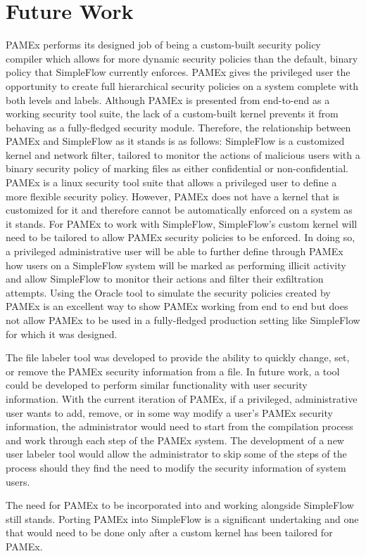 \section{Future Work}
\label{sec:FutureWork}
\par 
\vspace{\baselineskip}
\hspace{1em}
PAMEx performs its designed job of being a custom-built 
security policy compiler which allows for more dynamic security 
policies than the default, binary policy that SimpleFlow currently 
enforces. PAMEx gives the privileged user the opportunity to create 
full hierarchical security policies on a system complete with both 
levels and labels. Although PAMEx is presented from end-to-end as a 
working security tool suite, the lack of a custom-built kernel prevents 
it from behaving as a fully-fledged security module. Therefore, 
the relationship between PAMEx and SimpleFlow as it stands is as follows:
SimpleFlow is a customized kernel and network filter, tailored to monitor the actions of malicious
users with a binary security policy of marking files as either confidential
or non-confidential. PAMEx is a linux security tool suite that allows a privileged
user to define a more flexible security policy. However, PAMEx does not have a
kernel that is customized for it and therefore cannot be automatically enforced on
a system as it stands. For PAMEx to work with SimpleFlow, SimpleFlow’s custom kernel will
need to be tailored to allow PAMEx security policies to be enforced.
In doing so, a privileged administrative user will be able to further define through PAMEx how users on a SimpleFlow system
will be marked as performing illicit activity and allow SimpleFlow to monitor their actions
and filter their exfiltration attempts. 
Using the Oracle tool to simulate the security 
policies created by PAMEx is an excellent way to show PAMEx working 
from end to end but does not allow PAMEx to be used in a fully-fledged 
production setting like SimpleFlow for which it was designed.

The file labeler tool was developed to provide the ability to quickly 
change, set, or remove the PAMEx security information from a file. In 
future work, a tool could be developed to perform similar functionality 
with user security information. With the current iteration of PAMEx, if 
a privileged, administrative user wants to add, remove, or in some way 
modify a user’s PAMEx security information, the administrator would 
need to start from the compilation process and work through each step 
of the PAMEx system. The development of a new user labeler tool would 
allow the administrator to skip some of the steps of the process should 
they find the need to modify the security information of system users. 

The need for PAMEx to be incorporated into and working 
alongside SimpleFlow still stands. Porting PAMEx into SimpleFlow is a 
significant undertaking and one that would need to be done only after a 
custom kernel has been tailored for PAMEx.
